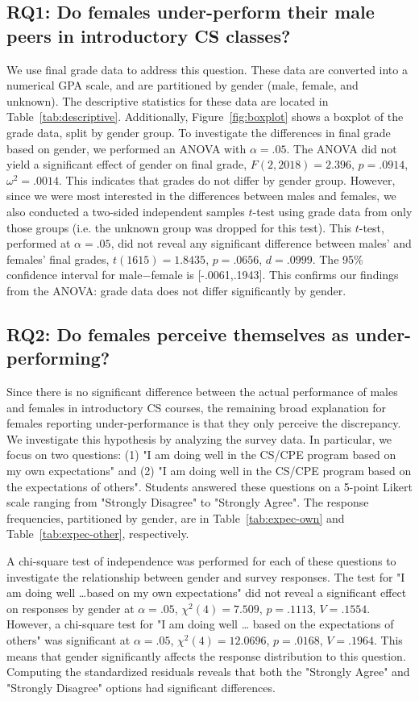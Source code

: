 \documentclass[a4paper,man,natbib]{apa6}
\begin{document}
\subsection{RQ1: Do females under-perform their male peers in introductory CS
classes?} We use final grade data to address this question. These data are
converted into a numerical GPA scale, and are partitioned by gender (male,
female, and unknown). The descriptive statistics for these data are located in
Table~\ref{tab:descriptive}. Additionally, Figure~\ref{fig:boxplot} shows a
boxplot of the grade data, split by gender group. To investigate the
differences in final grade based on gender, we performed an ANOVA with $\alpha
= .05$. The ANOVA did not yield a significant effect of gender on final grade,
$F(2,2018)=2.396$, $p=.0914$, $\omega^2=.0014$. This indicates that grades do
not differ by gender group. However, since we were most interested in the
differences between males and females, we also conducted a two-sided
independent samples $t$-test using grade data from only those groups (i.e. the
unknown group was dropped for this test). This $t$-test, performed at
$\alpha=.05$, did not reveal any significant difference between males' and
females' final grades, $t(1615)=1.8435$, $p=.0656$, $d=.0999$. The 95\%
confidence interval for male$-$female is [-.0061,.1943]. This confirms our
findings from the ANOVA: grade data does not differ significantly by gender.

\subsection{RQ2: Do females perceive themselves as under-performing?}
Since there is no significant difference between the actual performance of
males and females in introductory CS courses, the remaining broad explanation
for females reporting under-performance is that they only perceive the
discrepancy. We investigate this hypothesis by analyzing the survey data. In
particular, we focus on two questions: (1) "I am doing well in the CS/CPE
program based on my own expectations" and (2) "I am doing well in the CS/CPE
program based on the expectations of others". Students answered these questions
on a 5-point Likert scale ranging from "Strongly Disagree" to "Strongly Agree".
The response frequencies, partitioned by gender, are in
Table~\ref{tab:expec-own} and Table~\ref{tab:expec-other}, respectively. 

A chi-square test of independence was performed for each of these questions to
investigate the relationship between gender and survey responses. The test for
"I am doing well \dots based on my own expectations" did not reveal a
significant effect on responses by gender at $\alpha=.05$, $\chi^2(4)=7.509$,
$p=.1113$, $V=.1554$. However, a chi-square test for "I am doing well \dots
based on the expectations of others" was significant at $\alpha=.05$,
$\chi^2(4)=12.0696$, $p=.0168$, $V=.1964$. This means that gender significantly
affects the response distribution to this question. Computing the standardized
residuals reveals that both the "Strongly Agree" and "Strongly Disagree"
options had significant differences. 
\end{document}
